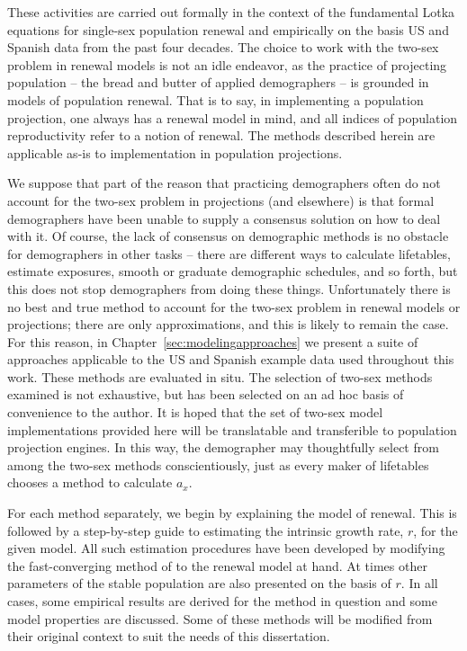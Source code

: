 These activities are carried out formally in the context of the fundamental
Lotka equations for single-sex population renewal and empirically on the basis 
US and Spanish data from the past four decades. The choice to work with the two-sex problem in
renewal models is not an idle endeavor, as the practice of projecting
population -- the bread and butter of applied demographers -- is grounded in
models of population renewal. That is to say, in implementing a population 
projection, one always has a renewal model in mind, and all indices of
population reproductivity refer to a notion of renewal. The methods
described herein are applicable as-is to implementation in population
projections.

We suppose that part of the reason that practicing
demographers often do not account for the two-sex problem in projections (and 
elsewhere) is that formal demographers have been unable to supply a
consensus solution on how to deal with it. Of course, the lack of consensus on
demographic methods is no obstacle for demographers in other tasks -- there are 
different ways to calculate lifetables, estimate exposures, smooth or graduate
demographic schedules, and so forth, but this does not stop demographers from
doing these things. Unfortunately there is no
best and true method to account for the two-sex problem in renewal models or projections; 
there are only approximations, and this is likely to remain the case. For this
reason, in Chapter~\ref{sec:modelingapproaches} we present a suite of 
approaches applicable to the US and Spanish example data 
used throughout this work. These methods are evaluated in situ. The selection of
two-sex methods examined is not exhaustive, but has been selected on
an ad hoc basis of convenience to the author. It is hoped that the set of
two-sex model implementations provided here will be translatable and
transferible to population projection engines. In this way, the demographer may
thoughtfully select from among the two-sex methods conscientiously, just as
every maker of lifetables chooses a method to calculate $a_x$.

For each method separately, we begin by explaining the model of renewal. This
is followed by a step-by-step guide to estimating the intrinsic growth rate,
$r$, for the given model. All such estimation procedures have been developed by
modifying the fast-converging method of \citet{coale1957new} to the renewal
model at hand. At times other parameters of the stable population are also presented
on the basis of $r$. In all cases, some empirical results are derived for the
method in question and some model properties are discussed. Some of these
methods will be modified from their original context to suit the needs of this
dissertation.

